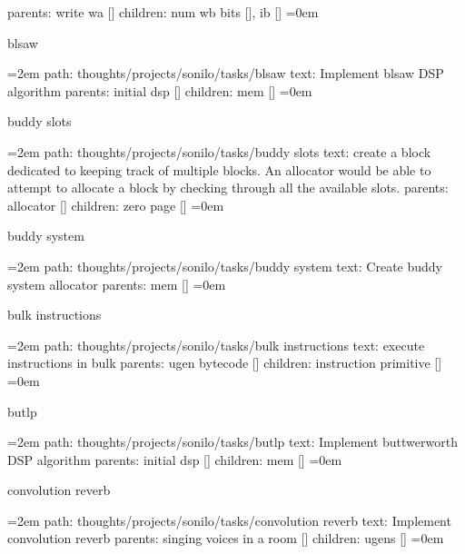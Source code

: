 \smallskip
parents:  write wa []
\smallskip
children: num wb bits [], ib []
\smallskip
\leftskip=0em
\par\endgroup
\bigskip
{}
blsaw
\smallskip
\par\begingroup
\leftskip=2em
path: thoughts/projects/sonilo/tasks/blsaw
\smallskip
text:  Implement blsaw DSP algorithm
\smallskip
parents:  initial dsp []
\smallskip
children: mem []
\smallskip
\leftskip=0em
\par\endgroup
\bigskip
{}
buddy slots
\smallskip
\par\begingroup
\leftskip=2em
path: thoughts/projects/sonilo/tasks/buddy slots
\smallskip
text:  create a block dedicated to keeping track of multiple blocks. An allocator would be able to attempt to allocate a block by checking through all the available slots.
\smallskip
parents:  allocator []
\smallskip
children: zero page []
\smallskip
\leftskip=0em
\par\endgroup
\bigskip
{}
buddy system
\smallskip
\par\begingroup
\leftskip=2em
path: thoughts/projects/sonilo/tasks/buddy system
\smallskip
text:  Create buddy system allocator
\smallskip
parents:  mem []
\smallskip
\leftskip=0em
\par\endgroup
\bigskip
{}
bulk instructions
\smallskip
\par\begingroup
\leftskip=2em
path: thoughts/projects/sonilo/tasks/bulk instructions
\smallskip
text:  execute instructions in bulk
\smallskip
parents:  ugen bytecode []
\smallskip
children: instruction primitive []
\smallskip
\leftskip=0em
\par\endgroup
\bigskip
{}
butlp
\smallskip
\par\begingroup
\leftskip=2em
path: thoughts/projects/sonilo/tasks/butlp
\smallskip
text:  Implement buttwerworth DSP algorithm
\smallskip
parents:  initial dsp []
\smallskip
children: mem []
\smallskip
\leftskip=0em
\par\endgroup
\bigskip
{}
convolution reverb
\smallskip
\par\begingroup
\leftskip=2em
path: thoughts/projects/sonilo/tasks/convolution reverb
\smallskip
text:  Implement convolution reverb
\smallskip
parents:  singing voices in a room []
\smallskip
children: ugens []
\smallskip
\leftskip=0em
\par\endgroup
\bigskip
{}
